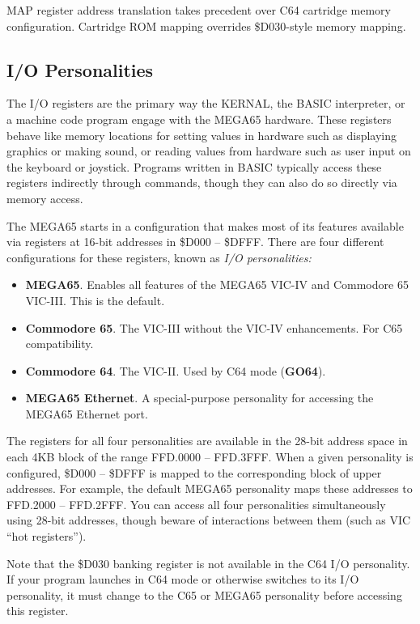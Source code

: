 MAP register address translation takes precedent over C64 cartridge memory configuration. Cartridge ROM mapping overrides \$D030-style memory mapping.

\subsection{I/O Personalities}

The I/O registers are the primary way the KERNAL, the BASIC interpreter, or a machine code program engage with the MEGA65 hardware. These registers behave like memory locations for setting values in hardware such as displaying graphics or making sound, or reading values from hardware such as user input on the keyboard or joystick. Programs written in BASIC typically access these registers indirectly through commands, though they can also do so directly via memory access.

The MEGA65 starts in a configuration that makes most of its features available via registers at 16-bit addresses in \$D000 -- \$DFFF. There are four different configurations for these registers, known as {\em I/O personalities:}

\begin{itemize}
\item {\bf MEGA65}. Enables all features of the MEGA65 VIC-IV and Commodore 65 VIC-III. This is the default.
\item {\bf Commodore 65}. The VIC-III without the VIC-IV enhancements. For C65 compatibility.
\item {\bf Commodore 64}. The VIC-II. Used by C64 mode (\textbf{GO64}).
\item {\bf MEGA65 Ethernet}. A special-purpose personality for accessing the MEGA65 Ethernet port.
\end{itemize}

The registers for all four personalities are available in the 28-bit address space in each 4KB block of the range FFD.0000 -- FFD.3FFF. When a given personality is configured, \$D000 -- \$DFFF is mapped to the corresponding block of upper addresses. For example, the default MEGA65 personality maps these addresses to FFD.2000 -- FFD.2FFF. You can access all four personalities simultaneously using 28-bit addresses, though beware of interactions between them (such as VIC ``hot registers'').

Note that the \$D030 banking register is not available in the C64 I/O personality. If your program launches in C64 mode or otherwise switches to its I/O personality, it must change to the C65 or MEGA65 personality before accessing this register.


